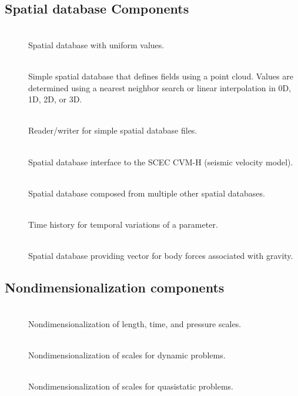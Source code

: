 \subsection{Spatial database Components}
\begin{description}
\item [] \\
Spatial database with uniform values.
\item [] \\
Simple spatial database that defines fields using a point cloud. Values
are determined using a nearest neighbor search or linear interpolation
in 0D, 1D, 2D, or 3D.
\item [] \\
Reader/writer for simple spatial database files.
\item [] \\
Spatial database interface to the SCEC CVM-H (seismic velocity model).
\item [] \\
Spatial database composed from multiple other spatial databases.
\item [] \\
Time history for temporal variations of a parameter.
\item [] \\
Spatial database providing vector for body forces associated with
gravity.
\end{description}

\subsection{Nondimensionalization components}
\begin{description}
\item [] \\
Nondimensionalization of length, time, and pressure scales.
\item [] \\
Nondimensionalization of scales for dynamic problems.
\item [] \\
Nondimensionalization of scales for quasistatic problems.
\end{description}

